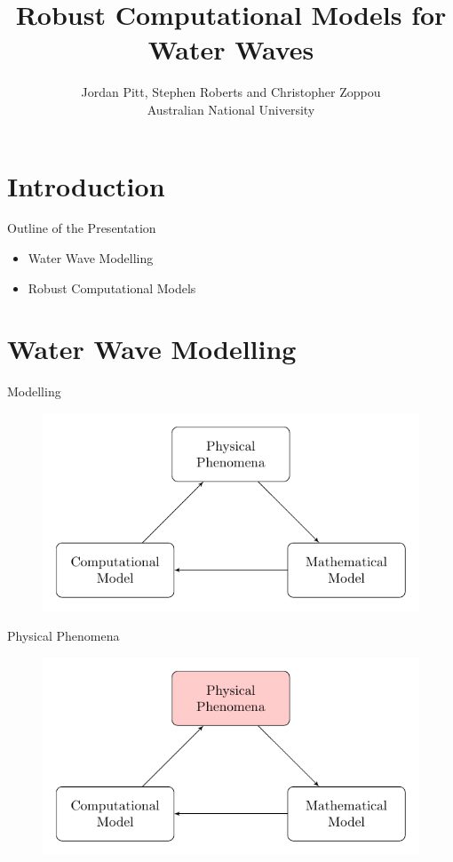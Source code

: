 \documentclass[pdf]{beamer}
\title{Robust Computational Models for Water Waves}
\author{Jordan Pitt, Stephen Roberts and Christopher Zoppou \\ Australian National University}
\begin{document}
\section{Introduction}
\begin{frame}
\titlepage
\end{frame}
\begin{frame}{Outline of the Presentation}
	\begin{itemize}
		\item Water Wave Modelling
		\item Robust Computational Models
	\end{itemize}
\end{frame}

\section{Water Wave Modelling}
\begin{frame}{Modelling}
	\begin{figure}
		\includegraphics[width=\textwidth]{./Pics/ModelDiagrams/FlowChart.pdf}
	\end{figure}
\end{frame}
\begin{frame}{Physical Phenomena}
	\begin{figure}
		\includegraphics[width=\textwidth]{./Pics/ModelDiagrams/FlowChartHigh1.pdf}
	\end{figure}
\end{frame}
\end{document}

